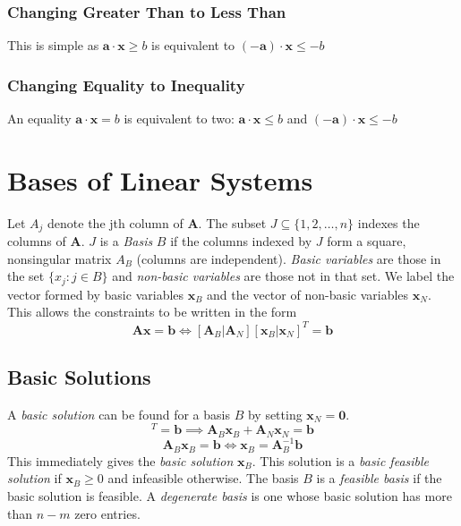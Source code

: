 \subsubsection{Changing Greater Than to Less Than}
This is simple as $\mathbf{a \cdot x}\geq b$ is equivalent to $(-\mathbf{a})\cdot\mathbf{x} \leq -b$

\subsubsection{Changing Equality to Inequality}
An equality $\mathbf{a \cdot x} = b$ is equivalent to two: $\mathbf{a}\cdot\mathbf{x} \leq b$ and $(-\mathbf{a})\cdot\mathbf{x} \leq -b$



\section{Bases of Linear Systems}
Let $A_j$ denote the jth column of $\mathbf{A}$. The subset $J \subseteq \{1,2,\hdots , n\}$ indexes the columns of $\mathbf{A}$. $J$ is a \emph{Basis} $B$ if the columns indexed by $J$ form a square, nonsingular matrix $A_B$ (columns are independent). \emph{Basic variables} are those in the set $\{x_j : j\in B\}$ and \emph{non-basic variables} are those not in that set. We label the vector formed by basic variables $\mathbf{x}_B$ and the vector of non-basic variables $\mathbf{x}_N$. This allows the constraints to be written in the form
\begin{equation*}
    \mathbf{Ax=b} \iff [\mathbf{A}_B | \mathbf{A}_N] [\mathbf{x}_B|\mathbf{x}_N]^T = \mathbf{b}
\end{equation*}


\subsection{Basic Solutions}
A \emph{basic solution} can be found for a basis $B$ by setting $\mathbf{x}_N=\mathbf{0}$.
\begin{equation*}
    [\mathbf{A}_B | \mathbf{A}_N] [\mathbf{x}_B|\mathbf{x}_N]^T = \mathbf{b} \implies \mathbf{A}_B\mathbf{x}_B + \mathbf{A}_N \mathbf{x}_N = \mathbf{b}
\end{equation*}
\begin{equation*}
    \mathbf{A}_B\mathbf{x}_B = \mathbf{b} \iff \mathbf{x}_B = \mathbf{A}_B^{-1}\mathbf{b}
\end{equation*}
This immediately gives the \emph{basic solution} $\mathbf{x}_B$. This solution is a \emph{basic feasible solution} if $\mathbf{x}_B \geq 0$ and infeasible otherwise. The basis $B$ is a \emph{feasible basis} if the basic solution is feasible. A \emph{degenerate basis} is one whose basic solution has more than $n-m$ zero entries.


